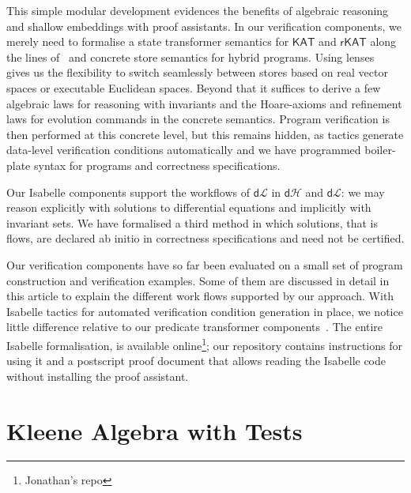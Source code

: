 \documentclass[envcountsame]{llncs}
\newcommand{\KAT}{\mathsf{KAT}}
\newcommand{\rKAT}{\mathsf{rKAT}}
\newcommand{\dL}{\mathsf{d}\mathcal{L}}
\newcommand{\dH}{\mathsf{d}\mathcal{H}}
\newcommand{\dR}{\mathsf{d}\mathcal{R}}
\newcommand\notein[3]{\todo[inline,linecolor=orange!80!black,backgroundcolor=#2!20]{#1: #3}%
}
\newcommand{\jin}[1]{\notein{{\bf JHM}}{jcolor}{#1}}
\begin{document}
This simple modular development evidences the benefits of algebraic
reasoning and shallow embeddings with proof assistants. In our
verification components, we merely need to formalise a state
transformer semantics for $\KAT$ and $\rKAT$ along the lines
of~\cite{afp:hybrid} and concrete store semantics for hybrid
programs. Using lenses~\cite{FosterZW16} gives us the flexibility to
switch seamlessly between stores based on real vector spaces or
executable Euclidean spaces. Beyond that it suffices to derive a few
algebraic laws for reasoning with invariants and the Hoare-axioms and
refinement laws for evolution commands in the concrete
semantics. Program verification is then performed at this concrete
level, but this remains hidden, as tactics generate data-level
verification conditions automatically and we have programmed
boiler-plate syntax for programs and correctness specifications.
\jin{I assume below, it's meant ``$\dH$ and $\dR$''}
Our Isabelle components support the  workflows of $\dL$ in $\dH$
and $\dL$: we may reason explicitly with solutions to differential
equations and implicitly with invariant sets. We have formalised a third
method in which solutions, that is flows, are declared ab initio in
correctness specifications and need not be certified.

Our verification components have so far been evaluated on a small set of
program construction and verification examples. Some of them are
discussed in detail in this article to explain the different work
flows supported by our approach. With Isabelle tactics for automated
verification condition generation in place, we notice little
difference relative to our predicate transformer
components~\cite{MuniveS19}.  The entire Isabelle formalisation, is
available online\footnote{Jonathan's repo}; our repository contains
instructions for using it and a postscript proof document that allows
reading the Isabelle code without installing the proof assistant.



\section{Kleene Algebra with Tests}\label{sec:kat} 

\end{document}
